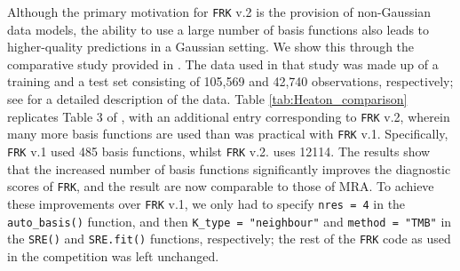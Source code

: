 \documentclass[12pt,a4paper]{article}
\begin{document}
Although the primary motivation for \texttt{FRK} v.2 is the provision of non-Gaussian data models, the ability to use  a large number of basis functions also leads to higher-quality predictions in a Gaussian setting.
We show this through the comparative study provided in \cite{Heaton_2019_comparative_study}.
The data used in that study was made up of a training and a test set consisting of 105,569 and 42,740 observations, respectively; see \cite{Heaton_2019_comparative_study} for a detailed description of the data.
Table \ref{tab:Heaton_comparison} replicates Table 3 of \cite{Heaton_2019_comparative_study}, with an additional entry corresponding to \texttt{FRK} v.2, wherein many more basis functions are used than was practical with \texttt{FRK} v.1.
 Specifically, \texttt{FRK} v.1 used 485 basis functions, whilst \texttt{FRK} v.2. uses 12114.
The results show that the increased number of basis functions significantly improves the diagnostic scores of \texttt{FRK}, and the result are now comparable to those of MRA. 
To achieve these improvements over \texttt{FRK} v.1, we only had to specify \texttt{nres = 4} in the \texttt{auto\_basis()} function, and then \texttt{K\_type = "neighbour"} and \texttt{method = "TMB"} in the \texttt{SRE()} and \texttt{SRE.fit()} functions, respectively; the rest of the \texttt{FRK} code as used in the competition was left unchanged. 
\end{document}
